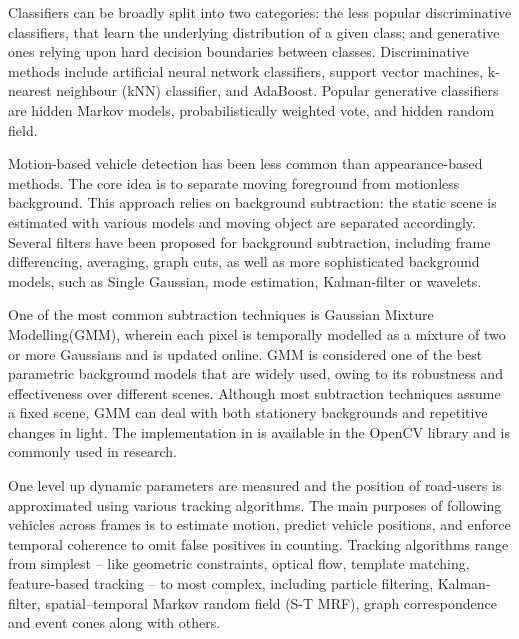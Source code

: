 Classifiers can be broadly split into two categories: the less popular discriminative classifiers, that learn the underlying distribution of a given class; and generative ones relying upon hard decision boundaries between classes\cite{Sivaraman2012}.
Discriminative methods include artificial neural network classifiers\cite{Xia2006}, support vector machines\cite{Cornelis2008}, k-nearest neighbour (kNN) classifier\cite{Morris2006}, and AdaBoost\cite{Khammari2005}.
Popular generative classifiers are hidden Markov models\cite{Jazayeri2011}, probabilistically weighted vote\cite{Lin2012}, and hidden random field\cite{Zhang2011}.

Motion-based vehicle detection has been less common than appearance-based methods.
The core idea is to separate moving foreground from motionless background.
This approach relies on background subtraction: the static scene is estimated with various models and moving object are separated accordingly.
Several filters have been proposed for background subtraction, including frame differencing\cite{Park2007}, averaging\cite{Kanhere2008}, graph cuts\cite{Woodford2009}, as well as more sophisticated background models, such as Single Gaussian\cite{Kumar2003}, mode estimation\cite{Zheng2006}, Kalman-filter\cite{Messelodi2005} or wavelets\cite{Gao2009}. 

One of the most common subtraction techniques is Gaussian Mixture Modelling(GMM)\cite{Niknejad2012, Wang2009,Zhang2016a}, wherein each pixel is temporally modelled as a mixture of two or more Gaussians and is updated online\cite{Stauffer1999,Stauffer2000}.
GMM is considered one of the best parametric background models that are widely used, owing to its robustness and effectiveness over different scenes\cite{Zhang2016}.
Although most subtraction techniques assume a fixed scene, GMM can deal with both stationery backgrounds and repetitive changes in light.
The implementation in \cite{Kaewtrakulpong2001} is available in the OpenCV library and is commonly used in research\cite{OpenCVMog2}.

One level up dynamic parameters are measured and the position of road-users is approximated using various tracking algorithms. 
The main purposes of following vehicles across frames is to estimate  motion, predict vehicle positions, and enforce temporal coherence to omit false positives in counting.
Tracking algorithms range from simplest -- like geometric constraints\cite{Rabe2007}, optical flow\cite{Bhaskar2015}, template matching\cite{Liu2007}, feature-based tracking\cite{Haselhoff2009} -- to most complex, including particle filtering\cite{Danescu2011}, Kalman-filter\cite{Bresson2015}, spatial–temporal Markov random field (S-T MRF)\cite{Zhu2005}, graph correspondence\cite{Lai2010} and event cones\cite{Andrienko2015} along with others. 

